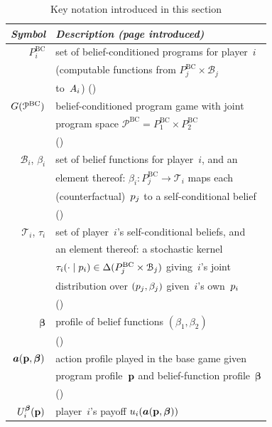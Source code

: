 \documentclass[sigconf]{aamas}
\newcommand{\fullbf}{\boldsymbol{\beta}}
\theoremstyle{definition}
\newcommand{\bcprogspacei}{P^{\mathrm{BC}}_i}
\newcommand{\bcprogspacej}{P^{\mathrm{BC}}_j}
\newcommand{\bcprogspaceone}{P^{\mathrm{BC}}_1}
\newcommand{\bcprogspacetwo}{P^{\mathrm{BC}}_2}
\newcommand{\allbcprog}{\mathcal{P}^{\mathrm{BC}}}
\newcommand{\beliefspacei}{\mathcal{B}_i}       %
\newcommand{\beliefspacej}{\mathcal{B}_j}       %
\newcommand{\scbspacei}{\mathcal{T}_i}          %
\begin{document}
\begin{table}[!htbp]
    \caption{Key notation introduced in this section}
    \label{tab:notation-bcpg}
    \begin{tabular}{rl}\toprule
        \textit{Symbol} & \textit{Description (page introduced)} \\ \midrule
        $\bcprogspacei$ & set of belief-conditioned programs for player~$i$ \\
        & (computable functions from $\bcprogspacej \times \beliefspacej$ \\
        & to~$A_i$) (\pageref{sub:bcprog}) \\
        $\game(\allbcprog)$ & belief-conditioned program game with joint \\
        & program space $\allbcprog = \bcprogspaceone \times \bcprogspacetwo$ \\
        & (\pageref{sub:bcprog}) \\
        $\beliefspacei$, $\beta_i$ & set of belief functions for player~$i$, and an \\
        & element thereof: $\beta_i: \bcprogspacej \to \scbspacei$ maps each \\
        & (counterfactual)~$p_j$ to a self-conditional belief \\
        & (\pageref{sub:bcprog}) \\
        $\scbspacei$, $\tau_i$ & set of player~$i$'s self-conditional beliefs, and \\
        & an element thereof: a stochastic kernel \\
        & $\tau_i(\cdot \mid \progi) \in \Delta(\bcprogspacej \times \beliefspacej)$ giving~$i$'s joint \\
        & distribution over $(p_j, \beta_j)$ given~$i$'s own~$p_i$ \\
        & (\pageref{sub:bcprog}) \\
        $\fullbf$ & profile of belief functions $(\beta_1, \beta_2)$ \\
        & (\pageref{sub:outcomes}) \\
        $\fullact(\fullprog, \fullbf)$ & action profile played in the base game given \\
        & program profile~$\textbf{p}$ and belief-function profile~$\fullbf$ \\
        & (\pageref{sub:outcomes}) \\
        $\progpayi^{\fullbf}(\fullprog)$ & player~$i$'s payoff $\payi(\fullact(\fullprog, \fullbf))$ \\

\end{tabular}
\end{table}
\end{document}
